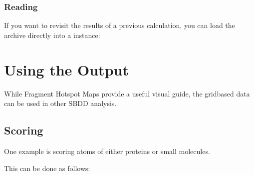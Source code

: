 \documentclass[letterpaper,10pt,english]{sphinxmanual}
\begin{document}
\subsubsection{Reading}
\label{\detokenize{tutorial:reading}}
If you want to revisit the results of a previous calculation, you can load the  archive directly into a
 instance:

\begin{sphinxVerbatim}[commandchars=\\\{\}]
   

  
\end{sphinxVerbatim}


\section{Using the Output}
\label{\detokenize{tutorial:using-the-output}}
While Fragment Hotspot Maps provide a useful visual guide, the grid\sphinxhyphen{}based data can be used in other SBDD analysis.


\subsection{Scoring}
\label{\detokenize{tutorial:scoring}}
One example is scoring atoms of either proteins or small molecules.

This can be done as follows:
\end{document}
